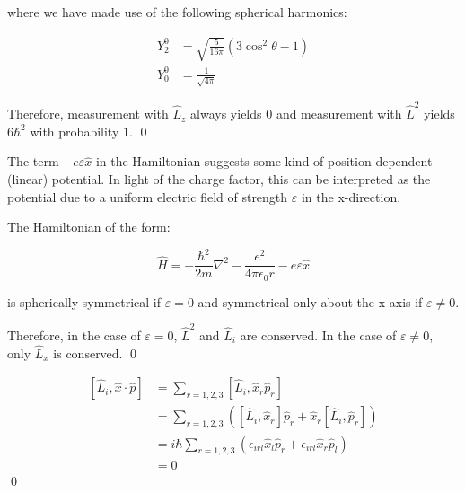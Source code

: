 \documentclass[12pt]{article}
\begin{document}
where we have made use of the following spherical harmonics:

\begin{equation}
\begin{split}
    Y_{2}^{0} &= \sqrt{\frac{5}{16\pi}} (3\cos^{2}{\theta} - 1) \\
    Y_{0}^{0} &= \frac{1}{\sqrt{4\pi}}
\end{split}
\end{equation}

Therefore, measurement with $\hat{L}_{z}$ always yields $0$ and measurement with $\hat{L}^{2}$ yields $6\hbar^{2}$ with probability $1$.
\qed



The term $-e\varepsilon \hat{x}$ in the Hamiltonian suggests some kind of position dependent (linear) potential. In light of the charge factor, this can be interpreted as the potential due to a uniform electric field of strength $\varepsilon$ in the x-direction.

The Hamiltonian of the form:

\begin{equation}
    \hat{H} = -\frac{\hbar^{2}}{2m} \nabla^{2} - \frac{e^{2}}{4\pi \epsilon_{0}r} - e\varepsilon \hat{x}
\end{equation}

is spherically symmetrical if $\varepsilon = 0$ and symmetrical only about the x-axis if $\varepsilon \neq 0$.

Therefore, in the case of $\varepsilon = 0$, $\hat{L}^{2}$ and $\hat{L}_{i}$ are conserved. In the case of $\varepsilon \neq 0$, only $\hat{L}_{x}$ is conserved.
\qed



\begin{equation}
\begin{split}
    [\hat{L}_{i}, \hat{x} \cdot \hat{p}] &= \sum_{r = 1, 2, 3} [\hat{L}_{i}, \hat{x}_{r} \hat{p}_{r}] \\
    &= \sum_{r = 1, 2, 3} \left( [\hat{L}_{i}, \hat{x}_{r}] \hat{p}_{r} + \hat{x}_{r} [\hat{L}_{i}, \hat{p}_{r}] \right) \\
    &= i\hbar \sum_{r = 1, 2, 3} \left( \epsilon_{irl} \hat{x}_{l} \hat{p}_{r} + \epsilon_{irl} \hat{x}_{r} \hat{p}_{l} \right) \\
    &= 0
\end{split}
\end{equation}
\qed
\end{document}
